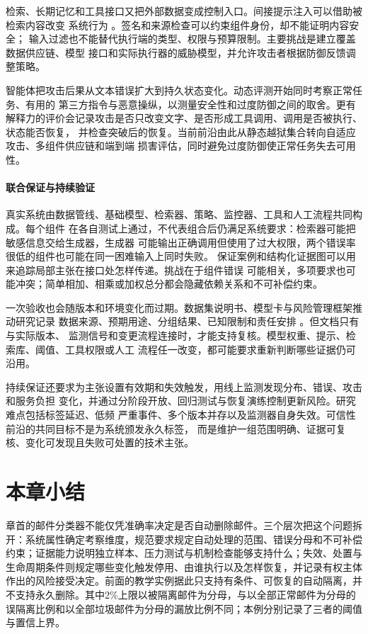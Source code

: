 检索、长期记忆和工具接口又把外部数据变成控制入口。间接提示注入可以借助被检索内容改变
系统行为
。签名和来源检查可以约束组件身份，却不能证明内容安全；
输入过滤也不能替代执行端的类型、权限与预算限制。主要挑战是建立覆盖数据供应链、模型
接口和实际执行器的威胁模型，并允许攻击者根据防御反馈调整策略。

智能体把攻击后果从文本错误扩大到持久状态变化。动态评测开始同时考察正常任务、有用的
第三方指令与恶意操纵，以测量安全性和过度防御之间的取舍。更有
解释力的评价会记录攻击是否只改变文字、是否形成工具调用、调用是否被执行、状态能否恢复，
并检查突破后的恢复。当前前沿由此从静态越狱集合转向自适应攻击、多组件供应链和端到端
损害评估，同时避免过度防御使正常任务失去可用性。

\paragraph{联合保证与持续验证}

真实系统由数据管线、基础模型、检索器、策略、监控器、工具和人工流程共同构成。每个组件
在各自测试上通过，不代表组合后仍满足系统要求：检索器可能把敏感信息交给生成器，生成器
可能输出正确调用但使用了过大权限，两个错误率很低的组件也可能在同一困难输入上同时失败。
保证案例和结构化证据图可以用来追踪局部主张在接口处怎样传递。挑战在于组件错误
可能相关，多项要求也可能冲突；简单相加、相乘或加权总分都会隐藏依赖关系和不可补偿约束。

一次验收也会随版本和环境变化而过期。数据集说明书、模型卡与风险管理框架推动研究记录
数据来源、预期用途、分组结果、已知限制和责任安排
。但文档只有与实际版本、
监测信号和变更流程连接时，才能支持复核。模型权重、提示、检索库、阈值、工具权限或人工
流程任一改变，都可能要求重新判断哪些证据仍可沿用。

持续保证还要求为主张设置有效期和失效触发，用线上监测发现分布、错误、攻击和服务负担
变化，并通过分阶段开放、回归测试与恢复演练控制更新风险。研究难点包括标签延迟、低频
严重事件、多个版本并存以及监测器自身失效。可信性前沿的共同目标不是为系统颁发永久标签，
而是维护一组范围明确、证据可复核、变化可发现且失败可处置的技术主张。

\section{本章小结}
\label{sec:trust-foundations-summary}

章首的邮件分类器不能仅凭准确率决定是否自动删除邮件。三个层次把这个问题拆开：系统属性确定考察维度，规范要求规定自动处理的范围、错误分母和不可补偿约束；证据能力说明独立样本、压力测试与机制检查能够支持什么；失效、处置与生命周期条件则规定哪些变化触发停用、由谁执行以及怎样恢复，并记录有权主体作出的风险接受决定。前面的教学实例据此只支持有条件、可恢复的自动隔离，并不支持永久删除。其中2\%上限以被隔离邮件为分母，与以全部正常邮件为分母的误隔离比例和以全部垃圾邮件为分母的漏放比例不同；本例分别记录了三者的阈值与置信上界。

